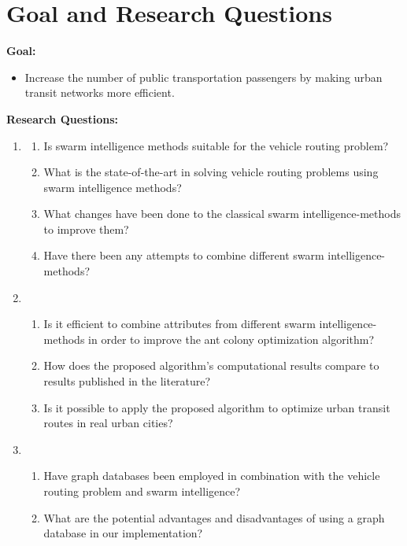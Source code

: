 \section{Goal and Research Questions}
\textbf{Goal:}
\begin{itemize}
\item \label{itm:goal} Increase the number of public transportation passengers by making urban transit networks more efficient.
\end{itemize}
\textbf{Research Questions:}
\begin{enumerate}[label=\textbf{\arabic*})]
\item \label{itm:1}
    \begin{enumerate}
    \item \label{itm:1a} Is swarm intelligence methods suitable for the vehicle routing problem?
    \item \label{itm:1b} What is the state-of-the-art in solving vehicle routing problems using swarm intelligence methods?
    \item \label{itm:1c} What changes have been done to the classical swarm intelligence-methods to improve them?
    \item \label{itm:1d} Have there been any attempts to combine different swarm intelligence-methods?
	\end{enumerate}
\item
    \begin{enumerate}
    \item \label{itm:2a} Is it efficient to combine attributes from different swarm intelligence-methods in order to improve the ant colony optimization algorithm?
    \item \label{itm:2b1} How does the proposed algorithm's computational results compare to results published in the literature?
    \item \label{itm:2b} Is it possible to apply the proposed algorithm to optimize urban transit routes in real urban cities?
    \end{enumerate}
\item
	\begin{enumerate}
    \item \label{itm:3b} Have graph databases been employed in combination with the vehicle routing problem and swarm intelligence?
	\item \label{itm:3a} What are the potential advantages and disadvantages of using a graph database in our implementation?
    \end{enumerate}
\end{enumerate}